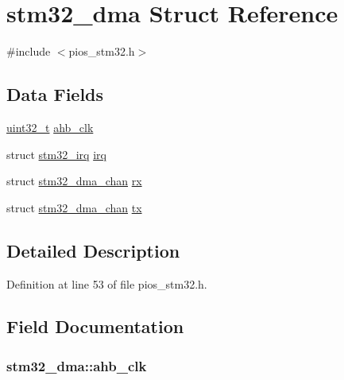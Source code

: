 \hypertarget{structstm32__dma}{\section{stm32\-\_\-dma Struct Reference}
\label{structstm32__dma}
}


{\ttfamily \#include $<$pios\-\_\-stm32.\-h$>$}

\subsection*{Data Fields}
\begin{DoxyCompactItemize}
\item 
\hyperlink{stdint_8h_a435d1572bf3f880d55459d9805097f62}{uint32\-\_\-t} \hyperlink{structstm32__dma_afdea0b36c63695ba4374a72291d8b6f1}{ahb\-\_\-clk}
\item 
struct \hyperlink{structstm32__irq}{stm32\-\_\-irq} \hyperlink{structstm32__dma_ae18ccde217e150c9de5b55b43d110a9d}{irq}
\item 
struct \hyperlink{structstm32__dma__chan}{stm32\-\_\-dma\-\_\-chan} \hyperlink{structstm32__dma_a967c78ffd2d021ac268f1d8c0a2c7e30}{rx}
\item 
struct \hyperlink{structstm32__dma__chan}{stm32\-\_\-dma\-\_\-chan} \hyperlink{structstm32__dma_a4ef0eab3e87fc579e24c36e51d31b88a}{tx}
\end{DoxyCompactItemize}


\subsection{Detailed Description}


Definition at line 53 of file pios\-\_\-stm32.\-h.



\subsection{Field Documentation}
\hypertarget{structstm32__dma_afdea0b36c63695ba4374a72291d8b6f1}{
\subsubsection[{ahb\-\_\-clk}]{ stm32\-\_\-dma\-::ahb\-\_\-clk}}\label{structstm32__dma_afdea0b36c63695ba4374a72291d8b6f1}


